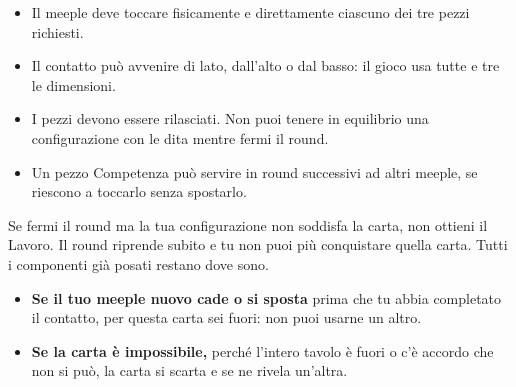\documentclass[10pt,a4paper]{article}
\newcommand{\titolo}[1]{\par\vspace{4.2mm}\noindent{\color{accento}\rule{11mm}{2.4pt}}\par\vspace{1mm}\noindent{\fontsize{15}{17}\selectfont\bfseries\MakeUppercase{#1}}\par\vspace{1.2mm}}
\newcommand{\meeple}[4][petrolio]{%
  \begin{scope}[shift={(#2)},rotate=#4,scale=#3]
    \fill[#1,rounded corners=#3*.42mm] (-1,7.1) -- (-4.1,5.7) -- (-4.5,5) -- (-4.1,4.2) -- (-1.8,4.6) -- (-3.4,.3) -- (-3,0) -- (-.8,0) -- (0,1.9) -- (.8,0) -- (3,0) -- (3.4,.3) -- (1.8,4.6) -- (4.1,4.2) -- (4.5,5) -- (4.1,5.7) -- (1,7.1) -- cycle;
    \fill[#1] (0,8.2) circle (1.75);
  \end{scope}}
\newcommand{\pezzo}[4][0]{%
  \begin{scope}[shift={(#2)},rotate=#1]
    \fill[black,opacity=.18,rounded corners=.6mm] (-2.5+.4,-2.5-.5) rectangle (2.5+.4,2.5-.5);
    \fill[#3,rounded corners=.6mm] (-2.5,-2.5) rectangle (2.5,2.5);
    \node[text=white,font=\fontsize{8}{8}\selectfont\bfseries,inner sep=0,rotate=#1] at (0,0) {#4};
  \end{scope}}
\newcommand{\pedana}[3]{\fill[petrolio,rounded corners=.5mm] (#1,#2-1.8) rectangle (#1+#3,#2);}
\begin{document}
\noindent\begin{minipage}[c]{.56\linewidth}
\begin{itemize}
  \item Il meeple deve toccare fisicamente e direttamente ciascuno dei tre pezzi richiesti.
  \item Il contatto può avvenire di lato, dall'alto o dal basso: il gioco usa tutte e tre le dimensioni.
  \item I pezzi devono essere rilasciati. Non puoi tenere in equilibrio una configurazione con le dita mentre fermi il round.
  \item Un pezzo Competenza può servire in round successivi ad altri meeple, se riescono a toccarlo senza spostarlo.
\end{itemize}
\end{minipage}\hfill
\begin{minipage}[c]{.40\linewidth}
\end{minipage}

\titolo{Chiamata errata}

Se fermi il round ma la tua configurazione non soddisfa la carta, non ottieni il Lavoro. Il round riprende subito e tu non puoi più conquistare quella carta. Tutti i componenti già posati restano dove sono.

\begin{itemize}
  \item \textbf{Se il tuo meeple nuovo cade o si sposta} prima che tu abbia completato il contatto, per questa carta sei fuori: non puoi usarne un altro.
  \item \textbf{Se la carta è impossibile,} perché l'intero tavolo è fuori o c'è accordo che non si può, la carta si scarta e se ne rivela un'altra.
\end{itemize}
\end{document}
